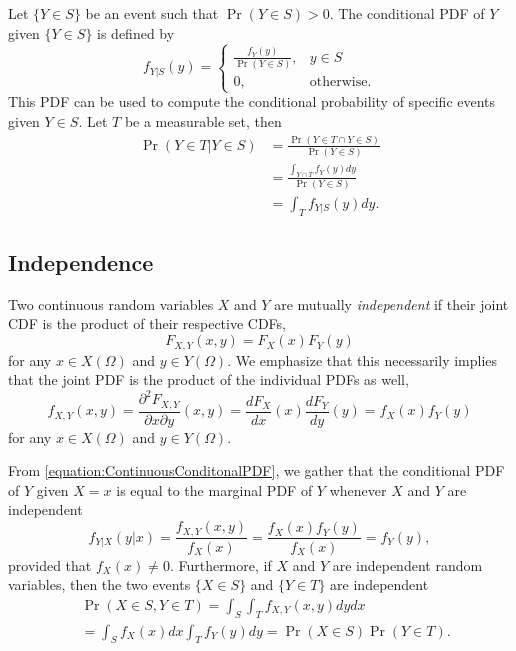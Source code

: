 Let $\{ Y \in S \}$ be an event such that $\Pr (Y \in S) > 0$.
The conditional PDF of $Y$ given $\{ Y \in S \}$ is defined by
\begin{equation*}
f_{Y|S} (y)
= \left\{ \begin{array}{cc} \frac{ f_Y(y) }{\Pr (Y \in S)}, & y \in S \\
0, & \text{otherwise}. \end{array} \right.
\end{equation*}
This PDF can be used to compute the conditional probability of specific events given $Y \in S$.
Let $T$ be a measurable set, then
\begin{equation*}
\begin{split}
\Pr ( Y \in T | Y \in S)
&= \frac{ \Pr ( Y \in T \cap Y \in S) }{ \Pr ( Y \in S) } \\
&= \frac{ \int_{Y \cap T} f_Y(y) dy }{ \Pr ( Y \in S) } \\
&= \int_{T} f_{Y|S} (y) dy .
\end{split}
\end{equation*}



\subsection{Independence}

Two continuous random variables $X$ and $Y$ are mutually \emph{independent} if their joint CDF is the product of their respective CDFs, 
\begin{equation*}
F_{X,Y} (x,y) = F_X (x) F_Y(y)
\end{equation*}
for any $x \in X(\Omega)$ and $y \in Y(\Omega)$.
We emphasize that this necessarily implies that the joint PDF is the product of the individual PDFs as well,
\begin{equation*}
f_{X,Y} (x,y) = \frac{\partial^2 F_{X,Y}}{\partial x \partial y} (x, y)
= \frac{d F_X}{dx} (x) \frac{d F_Y}{dy} (y)
= f_X (x) f_Y (y)
\end{equation*}
for any $x \in X(\Omega)$ and $y \in Y(\Omega)$.

From \eqref{equation:ContinuousConditonalPDF}, we gather that the conditional PDF of $Y$ given $X=x$ is equal to the marginal PDF of $Y$ whenever $X$ and $Y$ are independent
\begin{equation*}
f_{Y|X} (y|x) = \frac{f_{X,Y} (x, y)}{f_X(x)}
= \frac{f_X (x) f_Y (y)}{f_X(x)} = f_Y (y),
\end{equation*}
provided that $f_X(x) \neq 0$.
Furthermore, if $X$ and $Y$ are independent random variables, then the two events $\{ X \in S \}$ and $\{ Y \in T \}$ are independent
\begin{equation*}
\begin{split}
&\Pr (X \in S, Y \in T) = \int_S \int_T f_{X,Y} (x,y) dy dx \\
&= \int_S f_X (x) dx \int_T f_Y (y) dy
= \Pr (X \in S) \Pr (Y \in T).
\end{split}
\end{equation*}

